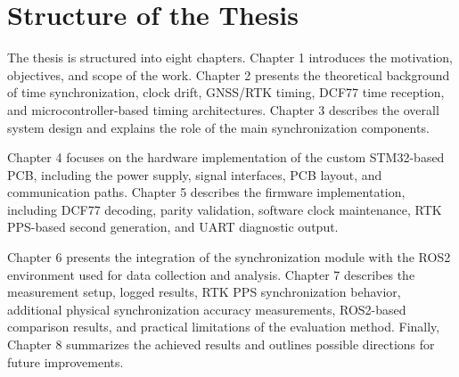 \section{Structure of the Thesis}

The thesis is structured into eight chapters. Chapter 1 introduces the motivation, objectives, and scope of the work. Chapter 2 presents the theoretical background of time synchronization, clock drift, GNSS/RTK timing, DCF77 time reception, and microcontroller-based timing architectures. Chapter 3 describes the overall system design and explains the role of the main synchronization components.

Chapter 4 focuses on the hardware implementation of the custom STM32-based PCB, including the power supply, signal interfaces, PCB layout, and communication paths. Chapter 5 describes the firmware implementation, including DCF77 decoding, parity validation, software clock maintenance, RTK PPS-based second generation, and UART diagnostic output.

Chapter 6 presents the integration of the synchronization module with the ROS2 environment used for data collection and analysis. Chapter 7 describes the measurement setup, logged results, RTK PPS synchronization behavior, additional physical synchronization accuracy measurements, ROS2-based comparison results, and practical limitations of the evaluation method. Finally, Chapter 8 summarizes the achieved results and outlines possible directions for future improvements.
